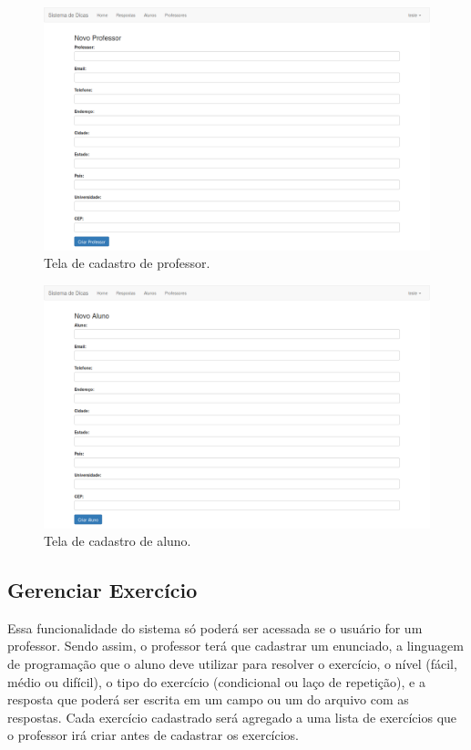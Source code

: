 \begin{figure}[]
	\centering
	\captionsetup{justification=centering}
	\includegraphics[width=.8\linewidth]{imagenssoftware/cadastroprofessor.png}
	\caption{Tela de cadastro de professor.}
	\label{figura:cadastroprofessor}
\end{figure}

\begin{figure}[]		
	\centering
	\captionsetup{justification=centering}
	\includegraphics[width=.8\linewidth]{imagenssoftware/cadastroaluno.png}
	\caption{Tela de cadastro de aluno.}
	\label{figura:cadastroaluno}
\end{figure}

\frontmatter

\subsection{Gerenciar Exercício}

Essa funcionalidade do sistema só poderá ser acessada se o usuário for um professor. Sendo assim, o professor terá que cadastrar um enunciado, a linguagem de programação que o aluno deve utilizar para resolver o exercício, o nível (fácil, médio ou difícil), o tipo do exercício (condicional ou laço de repetição), e a resposta que poderá ser escrita em um campo ou um  do arquivo com as respostas. Cada exercício cadastrado será agregado a uma lista de exercícios que o professor irá criar antes de cadastrar os exercícios.

